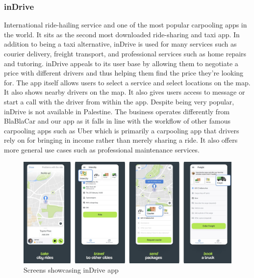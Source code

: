 \documentclass[a4paper, 12pt]{report} %
\begin{document}
            \subsubsection{inDrive}
                International ride-hailing service and one of the most popular carpooling apps in the world. It sits as the second most downloaded ride-sharing and taxi app. \cite{indrive_wiki} In addition to being a taxi alternative, inDrive is used for many services such as courier delivery, freight transport, and professional services such as home repairs and tutoring. inDrive appeals to its user base by allowing them to negotiate a price with different drivers and thus helping them find the price they're looking for. The app itself allows users to select a service and select locations on the map. It also shows nearby drivers on the map. It also gives users access to message or start a call with the driver from within the app.\cite{indrive_itunes} Despite being very popular, inDrive is not available in Palestine. The business operates differently from BlaBlaCar and our app as it falls in line with the workflow of other famous carpooling apps such as Uber which is primarily a carpooling app that drivers rely on for bringing in income rather than merely sharing a ride. It also offers more general use cases such as professional maintenance services.
                \begin{figure}[h]
                    \centering
                    \includegraphics[width=0.9\linewidth]{Images/inDrive_Overview.png}
                    \caption{Screens showcasing inDrive app \cite{indrive_itunes}}
                    \label{indrvie_galary}
                \end{figure}
            \pagebreak    
\end{document}
